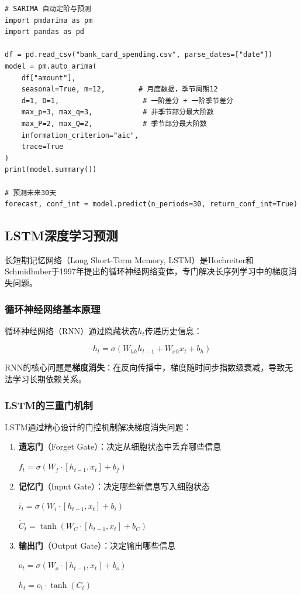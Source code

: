 \begin{lstlisting}[style=python]
# SARIMA 自动定阶与预测
import pmdarima as pm
import pandas as pd

df = pd.read_csv("bank_card_spending.csv", parse_dates=["date"])
model = pm.auto_arima(
    df["amount"],
    seasonal=True, m=12,        # 月度数据，季节周期12
    d=1, D=1,                    # 一阶差分 + 一阶季节差分
    max_p=3, max_q=3,            # 非季节部分最大阶数
    max_P=2, max_Q=2,            # 季节部分最大阶数
    information_criterion="aic",
    trace=True
)
print(model.summary())

# 预测未来30天
forecast, conf_int = model.predict(n_periods=30, return_conf_int=True)
\end{lstlisting}

\subsection{LSTM深度学习预测}

长短期记忆网络（Long Short-Term Memory, LSTM）是Hochreiter和Schmidhuber于1997年提出的循环神经网络变体，专门解决长序列学习中的梯度消失问题。

\subsubsection{循环神经网络基本原理}

循环神经网络（RNN）通过隐藏状态$h_t$传递历史信息：

\[
h_t = \sigma(W_{hh}h_{t-1} + W_{xh}x_t + b_h)
\]

RNN的核心问题是\textbf{梯度消失}：在反向传播中，梯度随时间步指数级衰减，导致无法学习长期依赖关系。

\subsubsection{LSTM的三重门机制}

LSTM通过精心设计的门控机制解决梯度消失问题：

\begin{enumerate}[leftmargin=2em]
  \item \textbf{遗忘门}（Forget Gate）：决定从细胞状态中丢弃哪些信息

  $f_t = \sigma(W_f \cdot [h_{t-1}, x_t] + b_f)$

  \item \textbf{记忆门}（Input Gate）：决定哪些新信息写入细胞状态

  $i_t = \sigma(W_i \cdot [h_{t-1}, x_t] + b_i)$

  $\tilde{C}_t = \tanh(W_C \cdot [h_{t-1}, x_t] + b_C)$

  \item \textbf{输出门}（Output Gate）：决定输出哪些信息

  $o_t = \sigma(W_o \cdot [h_{t-1}, x_t] + b_o)$

  $h_t = o_t \cdot \tanh(C_t)$
\end{enumerate}

